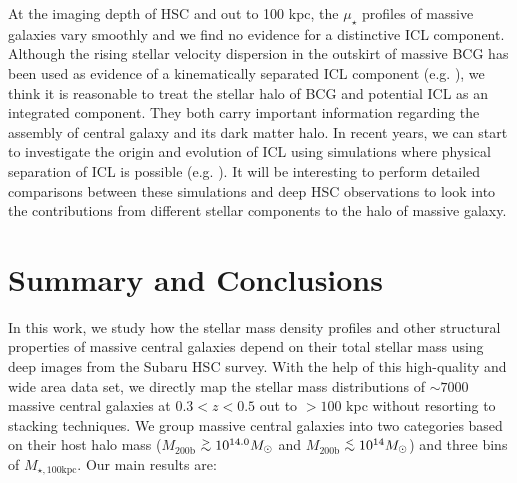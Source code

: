 \documentclass[a4paper,fleqn,usenatbib]{mnras}
\def\simlt{\lower.5ex\hbox{$\; \buildrel < \over {\sim} \;$}}
\def\simgt{\lower.5ex\hbox{$\; \buildrel > \over {\sim} \;$}}
\def\mhalo{{$M_{\mathrm{200b}}$}}
\def\mtot{{$M_{\star,100\mathrm{kpc}}$}}
\def\mden{{$\mu_{\star}$}}
\begin{document}
    At the imaging depth of HSC and out to 100 kpc, the \mden{} profiles of massive 
    galaxies vary smoothly and we find no evidence for a distinctive ICL component. 
    Although the rising stellar velocity dispersion in the outskirt of massive BCG
    has been used as evidence of a kinematically separated ICL component (e.g. 
    \citealt{Dressler1979, Carter1999, Kelson2002, Bender2015, Longobardi2015}), 
    we think it is reasonable to treat the stellar halo of BCG and potential ICL as 
    an integrated component. 
    They both carry important information regarding the assembly of central galaxy 
    and its dark matter halo. 
    In recent years, we can start to investigate the origin and evolution of ICL using 
    simulations where physical separation of ICL is possible
    (e.g. \citealt{SommerLarsen2005, Murante2007, Martel2012, Cui2014, Cooper2015, 
    Harris2017}). 
    It will be interesting to perform detailed comparisons between these simulations 
    and deep HSC observations to look into the contributions from different stellar 
    components to the halo of massive galaxy.
    

\section{Summary and Conclusions}
    \label{sec:summary}
    
    In this work, we study how the stellar mass density profiles and other structural
    properties of massive central galaxies depend on their total stellar mass using 
    deep images from the Subaru HSC survey. 
    With the help of this high-quality and wide area data set, we directly map the 
    stellar mass distributions of ${\sim}7000$ massive central galaxies at 
    $0.3 < z < 0.5$ out to $>100$ kpc without resorting to stacking techniques. 
    We group massive central galaxies into two categories based on their host halo 
    mass (\mhalo{}$\simgt 10^{14.0} M_{\odot}$ and \mhalo{}$\simlt 10^{14} M_{\odot}$)
    and three bins of \mtot{}.  
    Our main results are:  
    
\end{document}
